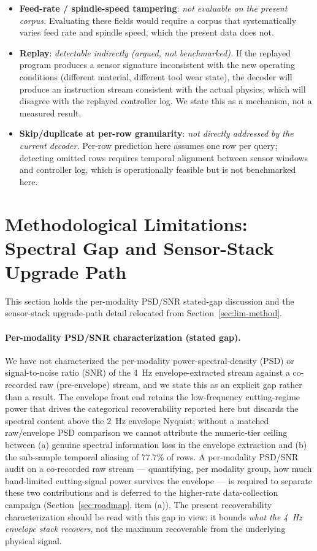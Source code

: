 \documentclass[11pt,a4paper]{article}
\begin{document}
\begin{itemize}
\item \textbf{Feed-rate / spindle-speed tampering}: \emph{not evaluable on the present corpus.} Evaluating these fields would require a corpus that systematically varies feed rate and spindle speed, which the present data does not.
\item \textbf{Replay}: \emph{detectable indirectly (argued, not benchmarked).} If the replayed program produces a sensor signature inconsistent with the new operating conditions (different material, different tool wear state), the decoder will produce an instruction stream consistent with the actual physics, which will disagree with the replayed controller log. We state this as a mechanism, not a measured result.
\item \textbf{Skip/duplicate at per-row granularity}: \emph{not directly addressed by the current decoder.} Per-row prediction here assumes one row per query; detecting omitted rows requires temporal alignment between sensor windows and controller log, which is operationally feasible but is not benchmarked here.
\end{itemize}

\section{Methodological Limitations: Spectral Gap and Sensor-Stack Upgrade Path}
\label{app:method-limit-detail}

This section holds the per-modality PSD/SNR stated-gap discussion and the
sensor-stack upgrade-path detail relocated from
Section~\ref{sec:lim-method}.

\paragraph{Per-modality PSD/SNR characterization (stated gap).} We have not characterized the per-modality power-spectral-density (PSD) or signal-to-noise ratio (SNR) of the 4~Hz envelope-extracted stream against a co-recorded raw (pre-envelope) stream, and we state this as an explicit gap rather than a result. The envelope front end retains the low-frequency cutting-regime power that drives the categorical recoverability reported here but discards the spectral content above the $2$~Hz envelope Nyquist; without a matched raw/envelope PSD comparison we cannot attribute the numeric-tier ceiling between (a) genuine spectral information loss in the envelope extraction and (b) the sub-sample temporal aliasing of $77.7\%$ of rows. A per-modality PSD/SNR audit on a co-recorded raw stream --- quantifying, per modality group, how much band-limited cutting-signal power survives the envelope --- is required to separate these two contributions and is deferred to the higher-rate data-collection campaign (Section~\ref{sec:roadmap}, item (a)). The present recoverability characterization should be read with this gap in view: it bounds \emph{what the 4~Hz envelope stack recovers}, not the maximum recoverable from the underlying physical signal.
\end{document}
